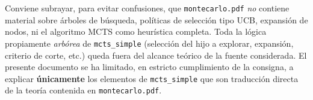 \documentclass[11pt,a4paper]{article}
\theoremstyle{definition}
\begin{document}
Conviene subrayar, para evitar confusiones, que \texttt{montecarlo.pdf} \emph{no} contiene material sobre árboles de búsqueda, políticas de selección tipo UCB, expansión de nodos, ni el algoritmo MCTS como heurística completa. Toda la lógica propiamente \emph{arbórea} de \texttt{mcts\_simple} (selección del hijo a explorar, expansión, criterio de corte, etc.) queda fuera del alcance teórico de la fuente considerada. El presente documento se ha limitado, en estricto cumplimiento de la consigna, a explicar \textbf{únicamente} los elementos de \texttt{mcts\_simple} que son traducción directa de la teoría contenida en \texttt{montecarlo.pdf}.
\end{document}
